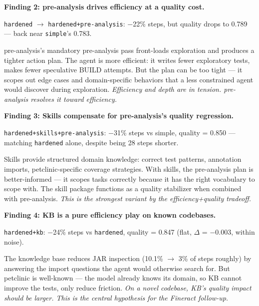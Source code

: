\documentclass[11pt,a4paper]{article}
\begin{document}
\begin{findingbox}
\textbf{Finding 2: pre-analysis drives efficiency at a quality cost.}

\texttt{hardened} $\to$ \texttt{hardened+pre-analysis}: $-$22\% steps,
but quality drops to 0.789 --- back near \texttt{simple}'s 0.783.

pre-analysis's mandatory pre-analysis pass front-loads exploration and produces a tighter
action plan. The agent is more efficient: it writes fewer exploratory tests,
makes fewer speculative BUILD attempts.
But the plan can be too tight --- it scopes out edge cases and domain-specific
behaviors that a less constrained agent would discover during exploration.
\emph{Efficiency and depth are in tension. pre-analysis resolves it toward efficiency.}
\end{findingbox}

\begin{findingbox}
\textbf{Finding 3: Skills compensate for pre-analysis's quality regression.}

\texttt{hardened+skills+pre-analysis}: $-$31\% steps vs simple, quality = 0.850 ---
matching \texttt{hardened} alone, despite being 28 steps shorter.

Skills provide structured domain knowledge: correct test patterns, annotation imports,
petclinic-specific coverage strategies. With skills, the pre-analysis plan is better-informed ---
it scopes tasks correctly because it has the right vocabulary to scope with.
The skill package functions as a quality stabilizer when combined with pre-analysis.
\emph{This is the strongest variant by the efficiency+quality tradeoff.}
\end{findingbox}

\begin{findingbox}
\textbf{Finding 4: KB is a pure efficiency play on known codebases.}

\texttt{hardened+kb}: $-$24\% steps vs \texttt{hardened}, quality = 0.847 (flat,
$\Delta$ = $-$0.003, within noise).

The knowledge base reduces JAR inspection (10.1\% $\to$ 3\% of steps roughly)
by answering the import questions the agent would otherwise search for.
But petclinic is well-known --- the model already knows its domain,
so KB cannot improve the tests, only reduce friction.
\emph{On a novel codebase, KB's quality impact should be larger.
This is the central hypothesis for the Fineract follow-up.}
\end{findingbox}
\end{document}
